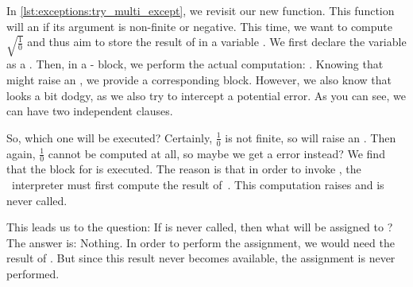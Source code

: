 %
%
In \cref{lst:exceptions:try_multi_except}, we revisit our new  function.
This function will  an  if its argument is non-finite or negative.
This time, we want to compute~$\sqrt{\frac{1}{0}}$ and thus aim to store the result of  in a variable .
We first declare the variable as a .
Then, in a - block, we perform the actual computation: .
Knowing that  might raise an , we provide a corresponding  block.
However, we also know that  looks a bit dodgy, as we also try to intercept a potential  error.
As you can see, we can have two independent  clauses.

So, which one will be executed?
Certainly, $\frac{1}{0}$ is not finite, so  will raise an .
Then again, $\frac{1}{0}$ cannot be computed at all, so maybe we get a  error instead?
We find that the  block for  is executed.
The reason is that in order to invoke , the \python\ interpreter must first compute the result of~.
This computation raises  and  is never called.

This leads us to the question:
If  is never called, then what will be assigned to ?
The answer is: Nothing.
In order to perform the assignment, we would need the result of .
But since this result never becomes available, the assignment is never performed.

